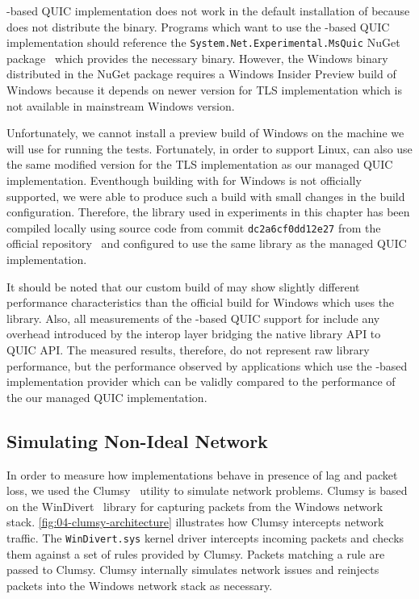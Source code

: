 
\libmsquic{}-based QUIC implementation does not work in the default installation of \dotnet{}
because \dotnet{} does not distribute the \libmsquic{} binary. Programs which want to use the
\libmsquic{}-based QUIC implementation should reference the \texttt{System.Net.Experimental.MsQuic}
NuGet package~\cite{SystemNetQuicExperimentalMsquic} which provides the necessary \libmsquic{}
binary. However, the Windows \libmsquic{} binary distributed in the NuGet package requires a Windows
Insider Preview build of Windows because it depends on newer \libschannel{} version for TLS
implementation which is not available in mainstream Windows version.

Unfortunately, we cannot install a preview build of Windows on the machine we will use for running
the tests. Fortunately, in order to support Linux, \libmsquic{} can also use the same modified
\libopenssl{} version for the TLS implementation as our managed QUIC implementation. Eventhough
building \libmsquic{} with \libopenssl{} for Windows is not officially supported, we were able to
produce such a build with small changes in the \libmsquic{} build configuration. Therefore, the
\libmsquic{} library used in experiments in this chapter has been compiled locally using source code
from commit \texttt{dc2a6cf0dd12e27} from the official \libmsquic{} repository~\cite{msquicGithub}
and configured to use the same \libopenssl{} library as the managed QUIC implementation.

It should be noted that our custom build of \libmsquic{} may show slightly different performance
characteristics than the official build for Windows which uses the \libschannel{} library. Also, all
measurements of the \libmsquic{}-based QUIC support for \dotnet{} include any overhead introduced by
the interop layer bridging the native library API to \dotnet{} QUIC API\@. The measured results,
therefore, do not represent raw \libmsquic{} library performance, but the performance observed by
\dotnet{} applications which use the \libmsquic{}-based implementation provider which can be validly
compared to the performance of the our managed QUIC implementation.

\subsection{Simulating Non-Ideal Network}

In order to measure how implementations behave in presence of lag and packet loss, we used the
Clumsy~\cite{clumsy} utility to simulate network problems. Clumsy is based on the
WinDivert~\cite{WinDivert} library for capturing packets from the Windows network stack.
\autoref{fig:04-clumsy-architecture} illustrates how Clumsy intercepts network traffic. The
\texttt{WinDivert.sys} kernel driver intercepts incoming packets and checks them against a set of
rules provided by Clumsy. Packets matching a rule are passed to Clumsy. Clumsy internally simulates
network issues and reinjects packets into the Windows network stack as necessary.

